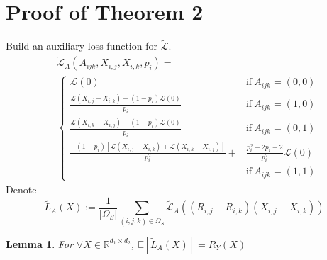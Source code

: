 \documentclass{article}
\numberwithin{equation}{section}
\newcommand{\R}{\mathbb{R}}
\newtheorem{lemma}{Lemma}
\newtheorem{sampling strategy}{Sampling Strategy}
\begin{document}
\section*{Proof of Theorem 2}

Build an auxiliary loss function for $\tilde{\mathcal{L}}$.
\begin{equation}
    \begin{aligned}
        & \tilde{\mathcal{L}}_A(A_{ijk}, X_{i,j}, X_{i,k}, p_i) =  \\
        &\begin{cases}
             \mathcal{L}(0) & \text{if}~ A_{ijk} = (0,0) \\
             \frac{ \mathcal{L}(X_{i,j} - X_{i,k}) - (1-p_i) \mathcal{L}(0)  }{p_i} &  \text{if}~ A_{ijk} = (1,0) \\
             \frac{ \mathcal{L}(X_{i,k} - X_{i,j}) - (1-p_i) \mathcal{L}(0) }{p_i} &  \text{if}~ A_{ijk} = (0,1) \\
             \frac{ -(1-p_i)[\mathcal{L}(X_{i,j} - X_{i,k}) + \mathcal{L}(X_{i,k} - X_{i,j})  ] }{p_i^2}
             + & \frac{p_i^2 - 2p_i + 2}{p_i^2} \mathcal{L}(0) \\  & \text{if}~ A_{ijk} = (1,1)
        \end{cases}
    \end{aligned}
    \label{eq:modifiedloss}
\end{equation}
Denote 
$$\tilde{L}_A(X) := \frac{1}{|\Omega_S|} \sum_{(i,j,k) \in \Omega_S}  \tilde{\mathcal{L}}_A( (R_{i,j} - R_{i,k})(X_{i,j} - X_{i,k}) )$$

\begin{lemma}
For $\forall X \in \R^{d_1 \times d_2}$, $\mathbb{E}[\tilde{L}_A(X)] = R_Y(X) $
\end{lemma}
\end{document}
